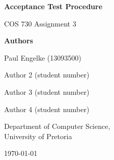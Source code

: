 \begin{titlepage}
	
	\centering
	
	{\textbf{\LARGE Acceptance Test Procedure} \par}
	\vspace{1cm}
	
	{\Large COS 730 Assignment 3 \par}
	\vspace{5cm}
	
	{\Large \textbf{Authors} \par}
	\vspace{0.5cm}
	{\Large Paul Engelke (13093500) \par}
	{\Large Author 2 (student number) \par}
	{\Large Author 3 (student number) \par}
	{\Large Author 4 (student number) \par}
	\vspace{1cm}
	{Department of Computer Science,\\ University of Pretoria \par}
	\vfill
	
	{\Large \today}
	
\end{titlepage}